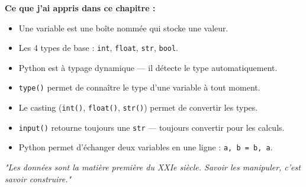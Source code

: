 \documentclass[12pt, a4paper]{article}
\begin{document}
\begin{tcolorbox}[
  enhanced, breakable,
  colback=bleuPrimaire,
  colframe=bleuPrimaire,
  arc=8pt,
  left=15pt, right=15pt, top=10pt, bottom=10pt
]
  \color{white}
  \textbf{\large\faClipboardList\quad Ce que j'ai appris dans ce chapitre :}

  \vspace{0.5em}
  \begin{itemize}[leftmargin=1.5em, itemsep=6pt]
    \item[\textcolor{bleuAccent}{\faCheckCircle}]
      Une variable est une boîte nommée qui stocke une valeur.
    \item[\textcolor{bleuAccent}{\faCheckCircle}]
      Les 4 types de base : \texttt{int}, \texttt{float}, \texttt{str}, \texttt{bool}.
    \item[\textcolor{bleuAccent}{\faCheckCircle}]
      Python est à typage dynamique — il détecte le type automatiquement.
    \item[\textcolor{bleuAccent}{\faCheckCircle}]
      \texttt{type()} permet de connaître le type d'une variable à tout moment.
    \item[\textcolor{bleuAccent}{\faCheckCircle}]
      Le casting (\texttt{int()}, \texttt{float()}, \texttt{str()}) permet de convertir les types.
    \item[\textcolor{bleuAccent}{\faCheckCircle}]
      \texttt{input()} retourne toujours une \texttt{str} — toujours convertir pour les calculs.
    \item[\textcolor{bleuAccent}{\faCheckCircle}]
      Python permet d'échanger deux variables en une ligne : \texttt{a, b = b, a}.
  \end{itemize}

  \vspace{0.5em}
  \textit{\textcolor{bleuClair}{"Les données sont la matière première du XXIe siècle.
  Savoir les manipuler, c'est savoir construire."}}
\end{tcolorbox}

\vspace{1cm}
\begin{center}
\end{center}
\end{document}
